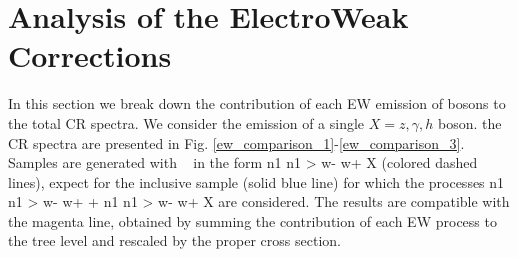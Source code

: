 \documentclass[epj,nopacs,fleqn]{svjour}
\begin{document}
\section{Analysis of the ElectroWeak Corrections}
In this section we break down the contribution of each EW emission of bosons to the total CR spectra. We consider the emission of a single $X=z,\gamma,h$ boson. the CR spectra are presented in Fig. \ref{ew_comparison_1}-\ref{ew_comparison_3}. Samples are generated with \MG~ in the form n1 n1 > w- w+ X (colored dashed lines), expect for the inclusive sample (solid blue line) for which the processes n1 n1 > w- w+ + n1 n1 > w- w+ X  are considered. The results are compatible with the magenta line, obtained by summing the contribution of each EW process to the tree level and rescaled by the proper cross section. 
\end{document}
